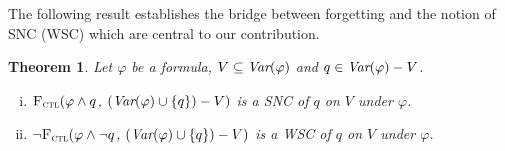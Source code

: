 \documentclass{article}
\newtheorem{theorem}{Theorem}
\begin{document}
The following result establishes the bridge between forgetting and the notion of SNC (WSC) which are central to our contribution.


\begin{theorem}\label{thm:SNC:WSC:forget}
 Let $\varphi$ be a formula, $V\subseteq\textit{Var}(\varphi)$ and $q\in\textit{Var}(\varphi)- V$.
 \begin{enumerate}[(i)]
   \item ${\textsc{F}_{\textsc{ctl}}} (\varphi \land q$, $(\textit{Var}(\varphi) \cup \{q\}) - V)$
   is a SNC of $q$ on $V$ under $\varphi$.
   \item  $\neg{\textsc{F}_{\textsc{ctl}}} (\varphi \land \neg q$, $(\textit{Var}(\varphi) \cup \{q\}) - V)$
   is a WSC of $q$ on $V$ under $\varphi$.
 \end{enumerate}
 \end{theorem}


\end{document}
